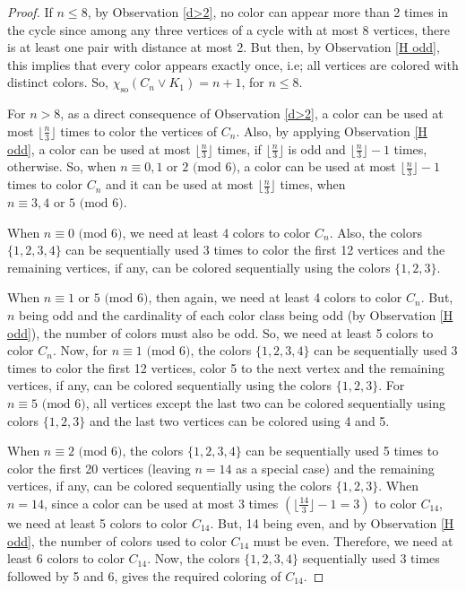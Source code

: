 \documentclass[10pt,a4paper]{amsart}
\begin{document}
\begin{proof}
If $n \leq 8$, by Observation \ref{d>2}, no color can appear more than 2 times in the cycle since among any three vertices of a cycle with at most 8 vertices, there is at least one pair with distance at most 2. But then, by Observation \ref{H odd}, this implies that every color appears exactly once, i.e; all vertices are colored with distinct colors. So, $\chi_{\text{so}}(C_n \vee K_1) = n+1$, for $ n\leq 8$. \par
For $n>8$, as a direct consequence of Observation \ref{d>2}, a color can be used at most $\lfloor \frac{n}{3} \rfloor$ times to color the vertices of $C_n$. Also, by applying Observation \ref{H odd}, a color can be used at most $\lfloor \frac{n}{3} \rfloor$ times, if $\lfloor \frac{n}{3} \rfloor$ is odd and $\lfloor \frac{n}{3} \rfloor - 1$ times, otherwise. So, when $n \equiv 0,1 \text{ or } 2\text{ (mod 6)}$, a color can be used at most $\lfloor \frac{n}{3} \rfloor - 1$ times to color $C_n$ and it can be used at most $\lfloor \frac{n}{3} \rfloor$ times, when $n \equiv 3,4 \text{ or } 5 \text{ (mod 6)}$.\par

When $n \equiv 0 \text{ (mod 6)}$, we need at least 4 colors to color $C_n$. Also, the colors $\{1,2,3,4\}$ can be sequentially used 3 times to color the first 12 vertices and the remaining vertices, if any, can be colored sequentially using the colors $\{1,2,3\}$.\par

When $n \equiv 1 \text{ or }5 \text{ (mod 6)}$, then again, we need at least 4 colors to color $C_n$. But, $n$ being odd and the cardinality of each color class being odd (by Observation \ref{H odd}), the number of colors must also be odd. So, we need at least 5 colors to color $C_n$. Now, for $n \equiv 1 \text{ (mod 6)}$, the colors $\{1,2,3,4\}$ can be sequentially used 3 times to color the first 12 vertices, color 5 to the next vertex and the remaining vertices, if any, can be colored sequentially using the colors $\{1,2,3\}$. For $n \equiv 5 \text{ (mod 6)}$, all vertices except the last two can be colored sequentially using colors $\{1,2,3\}$ and the last two vertices can be colored using 4 and 5.\par

When $n \equiv 2 \text{ (mod 6)}$,  the colors $\{1,2,3,4\}$ can be sequentially used 5 times to color the first 20 vertices (leaving $n=14$ as a special case) and the remaining vertices, if any, can be colored sequentially using the colors $\{1,2,3\}$. When $n=14$, since a color can be used at most 3 times $(
\lfloor\frac{14}{3}\rfloor - 1 = 3)$ to color $C_{14}$, we need at least 5 colors to color $C_{14}$. But, 14 being even, and by Observation \ref{H odd}, the number of colors used to color $C_{14}$ must be even. Therefore, we need at least 6 colors to color $C_{14}$. Now, the colors $\{1,2,3,4\}$ sequentially used 3 times followed by 5 and 6, gives the required coloring of $C_{14}$. \par


\end{proof}
\end{document}
